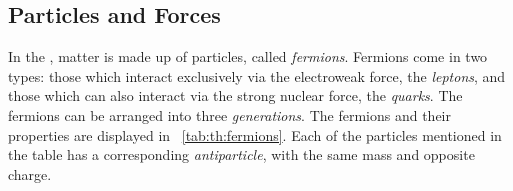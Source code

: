 \subsection{Particles and Forces}
\label{sec:th:particlesandforces}
 In the \SM, matter is made up of \SpinHalf particles, called \emph{fermions}. Fermions come in two types: those which interact exclusively via the electroweak force, the \emph{leptons}, and those which can also interact via the strong nuclear force, the \emph{quarks}. The fermions can be arranged into three \emph{generations}.
The \SM fermions and their properties are displayed in \Tab~\ref{tab:th:fermions}.
Each of the particles mentioned in the table has a corresponding \emph{antiparticle}, with the same mass and opposite charge.

